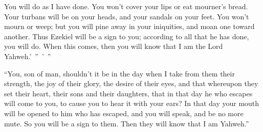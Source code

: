 {You will do as I have done. You won’t cover your lips or eat mourner’s bread.
Your turbans will be on your heads, and your sandals on your feet. You won’t mourn or weep; but you will pine away in your iniquities, and moan one toward another.
Thus Ezekiel will be a sign to you; according to all that he has done, you will do. When this comes, then you will know that I am the Lord Yahweh.’ ” ’ ”
\par }{\PP {}“You, son of man, shouldn’t it be in the day when I take from them their strength, the joy of their glory, the desire of their eyes, and that whereupon they set their heart, their sons and their daughters,
that in that day he who escapes will come to you, to cause you to hear it with your ears?
In that day your mouth will be opened to him who has escaped, and you will speak, and be no more mute. So you will be a sign to them. Then they will know that I am Yahweh.”

}
